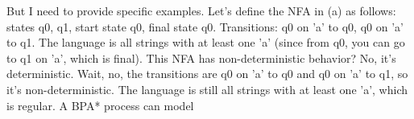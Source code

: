 But I need to provide specific examples. Let's define the NFA in (a) as follows: states {q0, q1}, start state q0, final state q0. Transitions: q0 on 'a' to q0, q0 on 'a' to q1. The language is all strings with at least one 'a' (since from q0, you can go to q1 on 'a', which is final). This NFA has non-deterministic behavior? No, it's deterministic. Wait, no, the transitions are q0 on 'a' to q0 and q0 on 'a' to q1, so it's non-deterministic. The language is still all strings with at least one 'a', which is regular. A BPA* process can model